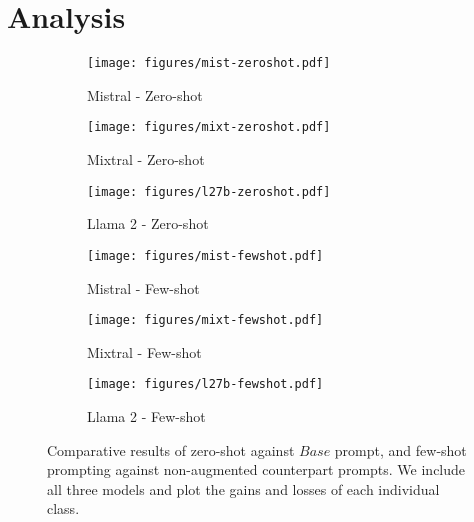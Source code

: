 \section{Analysis}

\begin{figure*}
    \centering
    \begin{subfigure}{0.32\textwidth}
        \texttt{[image: figures/mist-zeroshot.pdf]}
        \caption{Mistral - Zero-shot}
        \label{fig:model1_zero}
    \end{subfigure}
    \hfill
    \begin{subfigure}{0.32\textwidth}
        \texttt{[image: figures/mixt-zeroshot.pdf]}
        \caption{Mixtral - Zero-shot}
        \label{fig:model2_zero}
    \end{subfigure}
    \hfill
    \begin{subfigure}{0.32\textwidth}
        \texttt{[image: figures/l27b-zeroshot.pdf]}
        \caption{Llama 2 - Zero-shot}
        \label{fig:model3_zero}
    \end{subfigure}
    \hfill
    \begin{subfigure}{0.32\textwidth}
        \texttt{[image: figures/mist-fewshot.pdf]}
        \caption{Mistral - Few-shot}
        \label{fig:model1_few}
    \end{subfigure}
    \hfill
    \begin{subfigure}{0.32\textwidth}
        \texttt{[image: figures/mixt-fewshot.pdf]}
        \caption{Mixtral - Few-shot}
        \label{fig:model2_few}
    \end{subfigure}
    \hfill
    \begin{subfigure}{0.32\textwidth}
        \texttt{[image: figures/l27b-fewshot.pdf]}
        \caption{Llama 2 - Few-shot}
        \label{fig:model3_few}
    \end{subfigure}
    \hfill
    \caption{Comparative results of zero-shot against $Base$ prompt, and few-shot prompting against non-augmented counterpart prompts. We include all three models and plot the gains and losses of each individual class.}
    \label{fig:gains}
\end{figure*}

